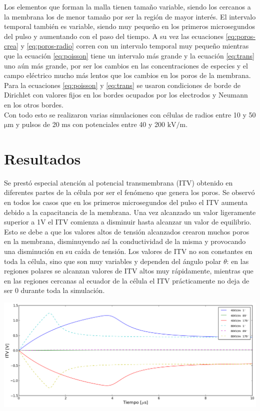 \documentclass[11pt, twocolumn]{article}
\begin{document}
Los elementos que forman la malla tienen tamaño variable, siendo los cercanos a la membrana los de menor tamaño por ser la región de mayor interés. El intervalo temporal también es variable, siendo muy pequeño en los primeros microsegundos del pulso y aumentando con el paso del tiempo. A su vez las ecuaciones \eqref{eq:poros-crea} y \eqref{eq:poros-radio} corren con un intervalo temporal muy pequeño mientras que la ecuación \eqref{eq:poisson} tiene un intervalo más grande y la ecuación \eqref{eq:trans} uno aún más grande, por ser los cambios en las concentraciones de especies y el campo eléctrico mucho más lentos que los cambios en los poros de la membrana. \\

Para la ecuaciones \ref{eq:poisson} y \ref{eq:trans} se usaron condiciones de borde de Dirichlet con valores fijos en los bordes ocupados por los electrodos y Neumann en los otros bordes.\\

Con todo esto se realizaron varias simulaciones con células de radios entre 10 y 50 $\si{\micro\metre}$ y pulsos de 20 $\si{\milli\second}$ con potenciales entre 40 y 200 $\si{\kilo\volt\per\metre}$.


\section{Resultados}
Se prestó especial atención al potencial transmembrana (ITV) obtenido en diferentes partes de la célula por ser el fenómeno que genera los poros. Se observó en todos los casos que en los primeros microsegundos del pulso el ITV aumenta debido a la capacitancia de la membrana. Una vez alcanzado un valor ligeramente superior a 1V el ITV comienza a disminuir hasta alcanzar un valor de equilibrio. Esto se debe a que los valores altos de tensión alcanzados crearon muchos poros en la membrana, disminuyendo así la conductividad de la misma y provocando una disminución en su caída de tensión. Los valores de ITV no son constantes en toda la célula, sino que son muy variables y dependen del ángulo polar $\theta$: en las regiones polares se alcanzan valores de ITV altos muy rápidamente, mientras que en las regiones cercanas al ecuador de la célula el ITV prácticamente no deja de ser 0 durante toda la simulación.

\begin{center}
	\includegraphics[width=1\linewidth]{itv-long}
\end{center}
\end{document}
